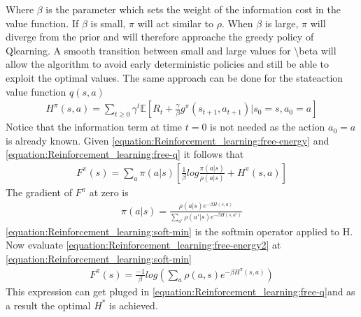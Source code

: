 \documentclass[letterpaper,10pt,english]{jupyterBook}
\begin{document}
\sphinxAtStartPar
Where \(\beta\) is the parameter which sets the weight of the information cost in the value function. If \(\beta\) is small, \(\pi\) will act similar to \(\rho\). When \(\beta\) is large, \(\pi\) will diverge from the prior and will therefore approache the greedy policy of Q\sphinxhyphen{}learning. A smooth transition between small and large values for \textbackslash{}beta will allow the algorithm to avoid early deterministic policies and still be able to exploit the optimal values. The same approach can be done for the state\sphinxhyphen{}action value function \(q(s,a)\)
\begin{equation}\label{equation:Reinforcement_learning:free-q}
\begin{split}H^{\pi}(s,a) = \sum_{t\geq 0 } \gamma^t \mathbb{E}[R_t + \frac{\gamma}{\beta} g^{\pi}(s_{t+1}, a_{t+1})|s_0=s, a_0=a] \end{split}
\end{equation}
\sphinxAtStartPar
Notice that the information term at time \(t=0\) is not needed as the action \(a_0 =a\) is already known. Given \eqref{equation:Reinforcement_learning:free-energy} and \eqref{equation:Reinforcement_learning:free-q} it follows that
\begin{equation}\label{equation:Reinforcement_learning:free-energy2}
\begin{split}F^{\pi}(s) = \sum_a \pi(a|s)[\frac{1}{\beta}log\frac{\pi(a|s)}{\rho(a|s)} + H^{\pi}(s,a)]\end{split}
\end{equation}
\sphinxAtStartPar
The gradient of \(F^{\pi}\) at zero is
\begin{equation}\label{equation:Reinforcement_learning:soft-min}
\begin{split}\pi(a|s) = \frac{\rho(a|s)e^{-\beta H(s,a)}}{\sum_{a'} \rho(a'|s)e^{-\beta H(s,a')}}\end{split}
\end{equation}
\sphinxAtStartPar
\eqref{equation:Reinforcement_learning:soft-min} is the soft\sphinxhyphen{}min operator applied to H. Now evaluate \eqref{equation:Reinforcement_learning:free-energy2} at \eqref{equation:Reinforcement_learning:soft-min}
\begin{equation*}
\begin{split} F^{\pi}(s) = \frac{-1}{\beta} log(\sum_a \rho(a,s) e^{-\beta H^{\pi}(s,a)}) \end{split}
\end{equation*}
\sphinxAtStartPar
This expression can get pluged in \eqref{equation:Reinforcement_learning:free-q}and as a result the optimal \(H^*\) is achieved.
\end{document}
